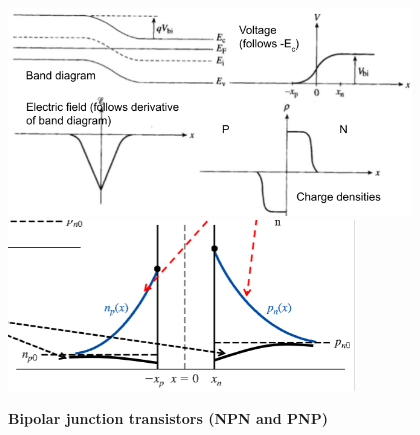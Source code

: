 \documentclass{article}
\begin{document}
\begin{center}
    \includegraphics[align=c, height=5.5cm]{pngraphs.png}
    \includegraphics[align=c, height=4.5cm]{pncarriers.png}
\end{center}
\textbf{Bipolar junction transistors (NPN and PNP)}
\end{document}
